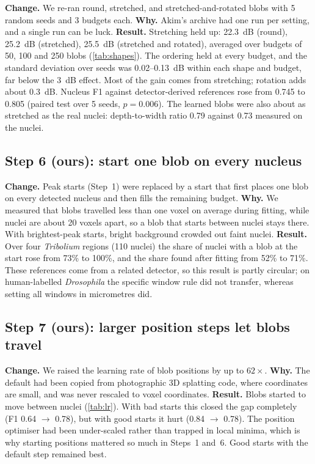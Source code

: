 \documentclass[
  paper=a4,
  fontsize=11pt,
  english,
  numbers=noenddot,
  parskip=half,
  cdgeometry=symmetric,
  cd=barcolor,
  cdfont=false
]{tudscrartcl}
\begin{document}
\textbf{Change.} We re-ran round, stretched, and stretched-and-rotated blobs with 5 random seeds
and 3 budgets each. \textbf{Why.} Akim's archive had one run per setting, and a single run can be
luck. \textbf{Result.} Stretching held up: \SI{22.3}{dB} (round), \SI{25.2}{dB} (stretched),
\SI{25.5}{dB} (stretched and rotated), averaged over budgets of 50, 100 and 250 blobs
(\cref{tab:shapes}). The ordering held at every budget, and the standard deviation over seeds
was 0.02--\SI{0.13}{dB} within each shape and budget, far below the \SI{3}{dB} effect.
Most of the gain comes from stretching; rotation adds about \SI{0.3}{dB}. Nucleus F1 against
detector-derived references rose from 0.745 to 0.805 (paired test over 5 seeds, $p=0.006$). The
learned blobs were also about as stretched as the real nuclei: depth-to-width ratio 0.79 against
0.73 measured on the nuclei.

\subsection{Step 6 (ours): start one blob on every nucleus}

\textbf{Change.} Peak starts (Step~1) were replaced by a start that first places one blob on
every detected nucleus and then fills the remaining budget. \textbf{Why.} We measured that blobs
travelled less than one voxel on average during fitting, while nuclei are about 20 voxels apart,
so a blob that starts between nuclei stays there. With brightest-peak starts, bright background
crowded out faint nuclei. \textbf{Result.} Over four \emph{Tribolium} regions (110 nuclei) the
share of nuclei with a blob at the start rose from 73\% to 100\%, and the share found after
fitting from 52\% to 71\%. These references come from a related detector, so this result is
partly circular; on human-labelled \emph{Drosophila} the specific window rule did not transfer,
whereas setting all windows in micrometres did.

\subsection{Step 7 (ours): larger position steps let blobs travel}

\textbf{Change.} We raised the learning rate of blob positions by up to $62\times$.
\textbf{Why.} The default had been copied from photographic 3D splatting code, where coordinates
are small, and was never rescaled to voxel coordinates. \textbf{Result.} Blobs started to move
between nuclei (\cref{tab:lr}). With bad starts this closed the gap completely (F1 0.64 $\to$
0.78), but with good starts it hurt (0.84 $\to$ 0.78). The position optimiser had been
under-scaled rather than trapped in local minima, which is why starting positions mattered so
much in Steps~1 and~6. Good starts with the default step remained best.
\end{document}
